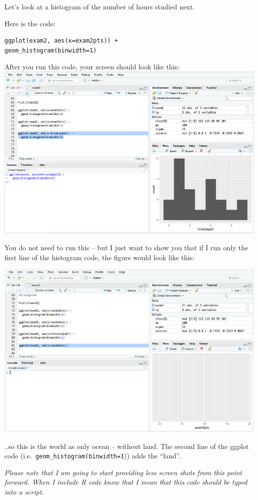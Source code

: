 \documentclass[
]{book}
\begin{document}
Let's look at a histogram of the number of hours studied next.

Here is the code:

\texttt{ggplot(exam2,\ aes(x=exam2pts))\ +}\\
\texttt{geom\_histogram(binwidth=1)}

After you run this code, your screen should look like this:\\
\includegraphics{img/tidyhist3.png}

You do not need to run this -- but I just want to show you that if I run only the first line of the histogram code, the figure would look like this:

\includegraphics{img/ggoc.png}

..so this is the world as only ocean -- without land. The second line of the ggplot code (i.e.~\texttt{geom\_histogram(binwidth=1})) adds the ``land''.

\emph{Please note that I am going to start providing less screen shots from this point forward. When I include R code know that I mean that this code should be typed into a script.}
\end{document}
